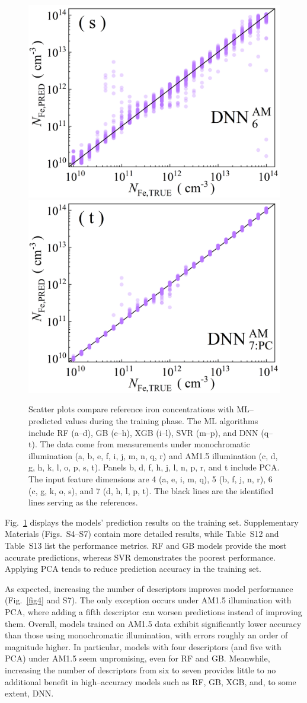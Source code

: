 \documentclass[a4paper,fleqn]{cas-sc}
\begin{document}
\begin{figure}
     \includegraphics[width=0.2\linewidth]{Fig3s.png}
     \includegraphics[width=0.2\linewidth]{Fig3t.png}
	  \caption{Scatter plots compare reference iron concentrations with ML--predicted values during the training phase. The ML algorithms include RF (a--d), GB (e--h), XGB (i--l), SVR (m--p), and DNN (q--t). The data come from measurements under monochromatic illumination (a, b, e, f, i, j, m, n, q, r) and AM1.5 illumination (c, d, g, h, k, l, o, p, s, t). Panels b, d, f, h, j, l, n, p, r, and t include PCA. The input feature dimensions are 4 (a, e, i, m, q), 5 (b, f, j, n, r), 6 (c, g, k, o, s), and 7 (d, h, l, p, t). The black lines are the identified lines serving as the references.
}\label{fig3}
\end{figure}

Fig.~\ref{fig3} displays the models’ prediction results on the training set.
Supplementary Materials (Figs.~S4--S7) contain more detailed results, while Table~S12 and Table~S13 list the performance metrics. 
RF and GB models provide the most accurate predictions, whereas SVR demonstrates the poorest performance. 
Applying PCA tends to reduce prediction accuracy in the training set.


As expected, increasing the number of descriptors improves model performance (Fig.~\ref{fig4} and S7). 
The only exception occurs under AM1.5 illumination with PCA, where adding a fifth descriptor can worsen predictions instead of improving them. 
Overall, models trained on AM1.5 data exhibit significantly lower accuracy than those using monochromatic illumination, with errors roughly an order of magnitude higher. 
In particular, models with four descriptors (and five with PCA) under AM1.5 seem unpromising, even for RF and GB. 
Meanwhile, increasing the number of descriptors from six to seven provides little to no additional benefit in high--accuracy models such as RF, GB, XGB, and, to some extent, DNN.
\end{document}
